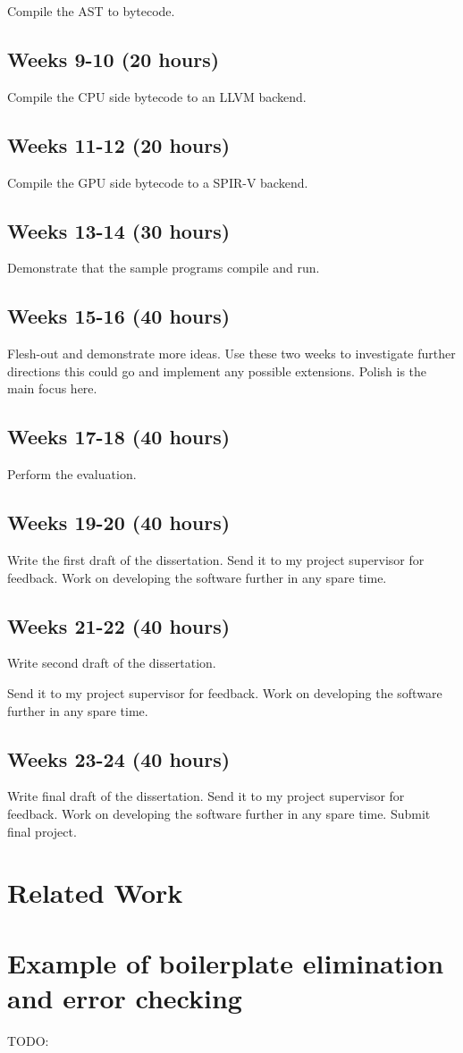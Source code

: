 \documentclass[11pt]{article}
\begin{document}
Compile the AST to bytecode.

\subsection{Weeks 9-10 (20 hours)}

Compile the CPU side bytecode to an LLVM backend.

\subsection{Weeks 11-12 (20 hours)}

Compile the GPU side bytecode to a SPIR-V backend.

\subsection{Weeks 13-14 (30 hours)}

Demonstrate that the sample programs compile and run.

\subsection{Weeks 15-16 (40 hours)}

Flesh-out and demonstrate more ideas. Use these two weeks to investigate
further directions this could go and implement any possible extensions. Polish
is the main focus here.

\subsection{Weeks 17-18 (40 hours)}

Perform the evaluation.

\subsection{Weeks 19-20 (40 hours)}

Write the first draft of the dissertation. Send it to my project supervisor for
feedback. Work on developing the software further in any spare time.

\subsection{Weeks 21-22 (40 hours)}

Write second draft of the dissertation.

Send it to my project supervisor for feedback. Work on developing the software
further in any spare time.


\subsection{Weeks 23-24 (40 hours)}

Write final draft of the dissertation. Send it to my project supervisor for
feedback. Work on developing the software further in any spare time. Submit
final project.

\section{Related Work}

\section{Example of boilerplate elimination and error checking}

TODO:
\end{document}
